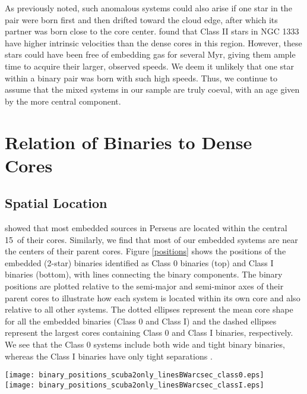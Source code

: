 \documentclass[usenatbib,a4paper]{mnras}
\begin{document}
As previously noted, such anomalous systems could also arise if one star in the pair were born first and then drifted toward the cloud edge, after which its partner was born close to the core center. \citet{Foster15} found that Class II stars in NGC 1333 have higher intrinsic velocities than the dense cores in this region. However, these stars could have been free of embedding gas for several Myr, giving them ample time to acquire their larger, observed speeds.  We deem it unlikely that one star within a binary pair was born with such high speeds. Thus, we continue to assume that the mixed systems in our sample are truly coeval, with an age given by the more central component.


\section{Relation of Binaries to Dense Cores}\label{results}

\subsection{Spatial Location}

\citet{Jorgensen07} showed that most embedded sources in Perseus are located within the central 15\arcsec\ of their cores.  Similarly, we find that most of our embedded systems are near the centers of their parent cores.  Figure \ref{positions} shows the positions of the embedded (2-star) binaries identified as Class 0 binaries (top) and Class I binaries (bottom), with lines connecting the binary components.  The binary positions are plotted relative to the semi-major and semi-minor axes of their parent cores to illustrate how each system is located within its own core and also relative to all other systems.  The dotted ellipses represent the mean core shape for all the embedded binaries (Class 0 and Class I) and the dashed ellipses represent the largest cores containing Class 0 and Class I binaries, respectively.  We see that the Class 0 systems include both wide and tight binary binaries, whereas the Class I binaries have only tight separations \citep[see also][]{Tobin16}.   

\begin{figure*}
\texttt{[image: binary\_positions\_scuba2only\_linesBWarcsec\_class0.eps]}\\
\texttt{[image: binary\_positions\_scuba2only\_linesBWarcsec\_classI.eps]}
\caption{Locations of embedded binaries within their parent dense cores for Class 0 systems (top) and Class I systems (bottom).  Stars show the position of the binary components along the semi-major and semi-minor axes of the host core with lines connecting them.  The dotted ellipses represent the mean core size for the Class 0 and Class I systems combined.  The dashed ellipses show the largest core size for Class 0 and Class I systems, respectively.  The core sizes have not been deconvolved with the beam (14.6\arcsec). \label{positions}}
\end{figure*}
\end{document}

